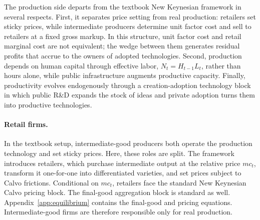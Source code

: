 \documentclass[a4paper,11pt]{article}
\begin{document}
The production side departs from the textbook New Keynesian framework in several respects.
First, it separates price setting from real production: retailers set sticky prices, while intermediate producers determine unit factor cost and sell to retailers at a fixed gross markup.
In this structure, unit factor cost and retail marginal cost are not equivalent; the wedge between them generates residual profits that accrue to the owners of adopted technologies.
Second, production depends on human capital through effective labor, $N_t = H_{t-1}L_t$, rather than hours alone, while public infrastructure augments productive capacity.
Finally, productivity evolves endogenously through a creation-adoption technology block in which public R\&D expands the stock of ideas and private adoption turns them into productive technologies.

\paragraph{Retail firms.}
In the textbook setup, intermediate-good producers both operate the production technology and set sticky prices.
Here, these roles are split.
The framework introduces retailers, which purchase intermediate output at the relative price $mc_t$, transform it one-for-one into differentiated varieties, and set prices subject to Calvo frictions.
Conditional on $mc_t$, retailers face the standard New Keynesian Calvo pricing block.
The final-good aggregation block is standard as well.
Appendix~\ref{app:equilibrium} contains the final-good and pricing equations.
Intermediate-good firms are therefore responsible only for real production.
\end{document}
